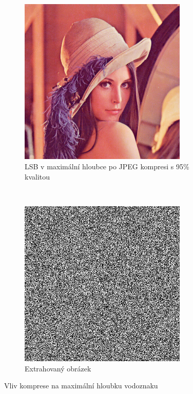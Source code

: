 \begin{figure}[h!]
    \begin{center}
        \begin{subfigure}[t]{0.5\textwidth}
            \centering
            \includegraphics[height=8cm]{images/lsb_7_95_qual.jpg}
            \caption{LSB v maximální hloubce po JPEG kompresi s 95\% kvalitou}
        \end{subfigure}%
        ~
        \begin{subfigure}[t]{0.5\textwidth}
            \centering
            \includegraphics[height=8cm]{images/lsb_7_95_qual_extracted.jpg}
            \caption{Extrahovaný obrázek}
        \end{subfigure}
        \caption{Vliv komprese na maximální hloubku vodoznaku}
    \end{center}
\end{figure}


